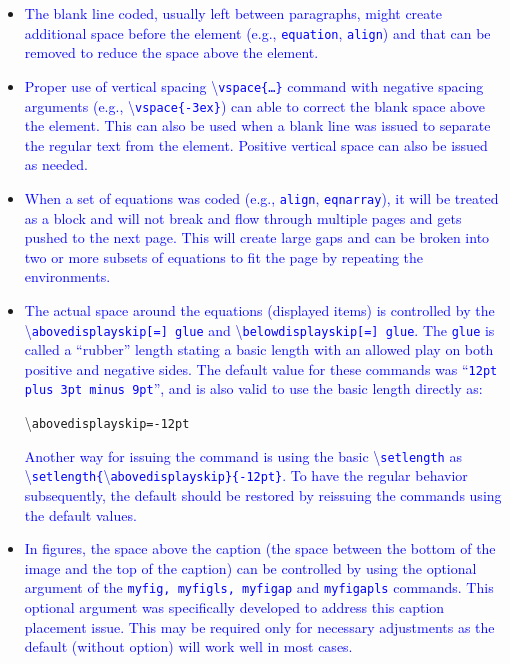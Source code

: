 \documentclass[phd]{ndsu-thesis-2022}
\newcommand\italk[1]{\textcolor{blue}{#1}}  %
\newcommand\cmd[1]{\textbackslash\texttt{#1}}  %
\begin{document}
\begin{itemize}
\item
\italk{The blank line coded, usually left between paragraphs, might create additional space before the element (e.g., \texttt{equation}, \texttt{align}) and that can be removed to reduce the space above the element.}
\item
\italk{Proper use of vertical spacing \cmd{vspace\{\ldots\}} command with negative spacing arguments (e.g., \cmd{vspace\{-3ex\}}) can able to correct the blank space above the element. This can also be used when a blank line was issued to separate the regular text from the element. Positive vertical space can also be issued as needed.}
\item
\italk{When a set of equations was coded (e.g., \texttt{align}, \texttt{eqnarray}), it will be treated as a block and will not break and flow through multiple pages and gets pushed to the next page. This will create large gaps and can be broken into two or more subsets of equations to fit the page by repeating the environments.}
\item
\italk{The actual space around the equations (displayed items) is controlled by the \\ \cmd{abovedisplayskip[=] glue} and \cmd{belowdisplayskip[=] glue}.
The \texttt{glue} is called a ``rubber'' length stating a basic length with an allowed play on both positive and negative sides. The default value for these commands was ``\texttt{12pt plus 3pt minus 9pt}'', and is also valid to use the basic length directly as:} 

\cmd{abovedisplayskip=-12pt}

\italk{Another way for issuing the command is using the basic \cmd{setlength} as \\ \cmd{setlength\{}\cmd{abovedisplayskip\}\{-12pt\}}. To have the regular behavior subsequently, the default should be restored by reissuing the commands using the default values.}
\item
\italk{In figures, the space above the caption (the space between the bottom of the image and the top of the caption) can be controlled by using the optional argument of the \texttt{myfig, myfigls, myfigap} and \texttt{myfigapls} commands. This optional argument was specifically developed to address this caption placement issue. This may be required only for necessary adjustments as the default (without option) will work well in most cases.}
\end{itemize}

\end{document}
